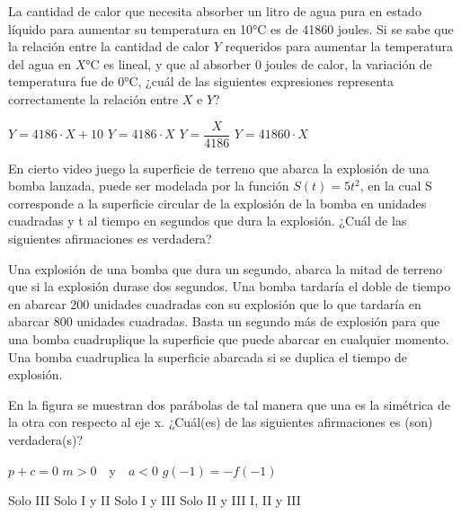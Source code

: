 \documentclass[borrador]{srs3}
\begin{document}
\begin{preguntas}
\pregunta La cantidad de calor que necesita absorber un litro de agua pura en estado líquido para aumentar su temperatura en 10°C es de 41860 joules. Si se sabe que la relación entre la cantidad de calor $Y$ requeridos para aumentar la temperatura del agua en $X$°C es lineal, y que al absorber 0 joules de calor, la variación de temperatura fue de 0°C, ¿cuál de las siguientes expresiones representa correctamente la relación entre $X$ e $Y$?
\begin{alternativas}
\alternativa \(Y = 4186 \cdot X + 10\)
\alternativa \(Y = 4186 \cdot X\)
\alternativa \(Y = \dfrac{X}{4186}\)
\alternativa \(Y = 41860 \cdot X\)
\end{alternativas}
\pregunta En cierto video juego la superficie de terreno que abarca la explosión de una bomba lanzada, puede ser modelada por la función \(S\left(t\right) = 5t^2\), en la cual S corresponde a la superficie circular de la explosión de la bomba en unidades cuadradas y t al tiempo en segundos que dura la explosión. ¿Cuál de las siguientes afirmaciones es verdadera?
\begin{alternativas}
\alternativa Una explosión de una bomba que dura un segundo, abarca la mitad de terreno que si la explosión durase dos segundos.
\alternativa Una bomba tardaría el doble de tiempo en abarcar 200 unidades cuadradas con su explosión que lo que tardaría en abarcar 800 unidades cuadradas.
\alternativa Basta un segundo más de explosión para que una bomba cuadruplique la superficie que puede abarcar en cualquier momento.
\alternativa Una bomba cuadruplica la superficie abarcada si se duplica el tiempo de explosión.
\end{alternativas}

\pregunta En la figura se muestran dos parábolas de tal manera que una es la simétrica de la otra con respecto al eje x. ¿Cuál(es) de las siguientes afirmaciones es (son) verdadera(s)?
\begin{columnas}[0.5]
\begin{opciones}
\opcion \(p+c = 0\)
\opcion \(m > 0\)~~y~~\(a < 0\)
\opcion \(g\left(-1\right) = -f\left(-1\right)\)
\end{opciones}
\begin{alternativas}
\alternativa Solo III
\alternativa Solo I y II
\alternativa Solo I y III
\alternativa Solo II y III
\alternativa I, II y III
\end{alternativas}
\siguiente
{}
\end{columnas}


\end{preguntas}
\end{document}
